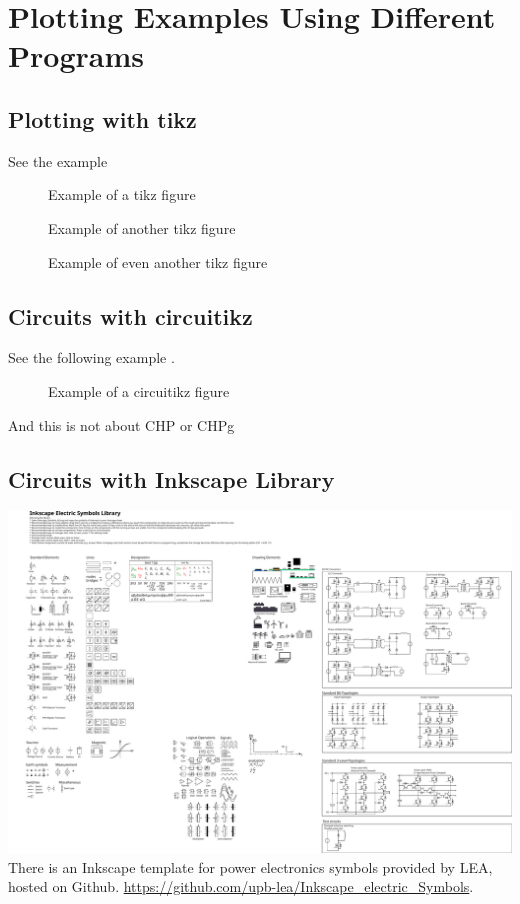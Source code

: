 \chapter{Plotting Examples Using Different Programs} 
\label{cha:evaluation}

\section{Plotting with tikz}

See the example 
\begin{figure}[ht]
    \centering
    
    \caption{Example of a tikz figure}
    \label{fig:tikz_example_01}
\end{figure}
\begin{figure}[ht]
    \centering
    
    \caption{Example of another tikz figure}
    \label{fig:tikz_example_02}
\end{figure}
\begin{figure}[ht]
    \centering
    
    \caption{Example of even another tikz figure}
    \label{fig:tikz_example_03}
\end{figure}



\section{Circuits with circuitikz}
See the following example .
\begin{figure}[ht]
    \centering
    
    \caption{Example of a circuitikz figure}
    \label{fig:circuitikz_example}
\end{figure}


And this is not about \acrshort{CHP} or \gls{CHPg}

\section{Circuits with Inkscape Library}
\includegraphics[]{fig/inkscape/Inkscape_Symbols_All.pdf}
There is an Inkscape template for power electronics symbols provided by LEA, hosted on Github. \href{https://github.com/upb-lea/Inkscape_electric_Symbols}{https://github.com/upb-lea/Inkscape\_electric\_Symbols}.

